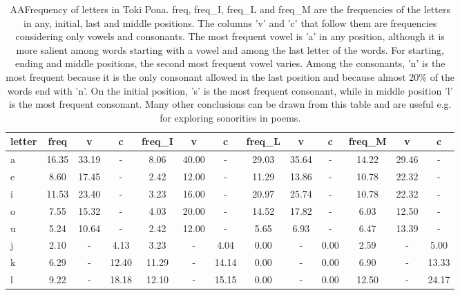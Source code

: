 \begin{table*}[h!]
\scriptsize
\begin{center}
\caption{AAFrequency of letters in Toki Pona.
                    freq, freq\_I, freq\_L and freq\_M are
                    the frequencies of the letters in any, initial, last and middle
                    positions.
                    The columns 'v' and 'c' that follow them are frequencies
                    considering only vowels and consonants.
                    The most frequent vowel is 'a' in any position,
                    although it is more salient among words starting with a vowel
                    and among the last letter of the words.
                    For starting, ending and middle positions, the second most frequent
                    vowel varies.
                    Among the consonants, 'n' is the most frequent because it is
                    the only consonant allowed in the last position and because
                    almost 20\% of the words end with 'n'.
                    On the initial position, 's' is the most frequent consonant,
                    while in middle position 'l' is the most frequent consonant.
                    Many other conclusions can be drawn from this table and are
                    useful e.g. for exploring sonorities in poems.}\label{freqLet}
\begin{tabular}{  l | c   c   c | c   c   c | c   c   c | c   c   c  }
letter & freq  & v  & c  & freq\_I  & v  & c  & freq\_L  & v  & c  & freq\_M  & v  & c \\\hline
a & 16.35  & 33.19  & -  & 8.06  & 40.00  & -  & 29.03  & 35.64  & -  & 14.22  & 29.46  & - \\
e & 8.60  & 17.45  & -  & 2.42  & 12.00  & -  & 11.29  & 13.86  & -  & 10.78  & 22.32  & - \\
i & 11.53  & 23.40  & -  & 3.23  & 16.00  & -  & 20.97  & 25.74  & -  & 10.78  & 22.32  & - \\
o & 7.55  & 15.32  & -  & 4.03  & 20.00  & -  & 14.52  & 17.82  & -  & 6.03  & 12.50  & - \\
u & 5.24  & 10.64  & -  & 2.42  & 12.00  & -  & 5.65  & 6.93  & -  & 6.47  & 13.39  & - \\\hline
j & 2.10  & -  & 4.13  & 3.23  & -  & 4.04  & 0.00  & -  & 0.00  & 2.59  & -  & 5.00 \\
k & 6.29  & -  & 12.40  & 11.29  & -  & 14.14  & 0.00  & -  & 0.00  & 6.90  & -  & 13.33 \\
l & 9.22  & -  & 18.18  & 12.10  & -  & 15.15  & 0.00  & -  & 0.00  & 12.50  & -  & 24.17 \\\hline

\end{tabular}
\end{center}
\end{table*}
